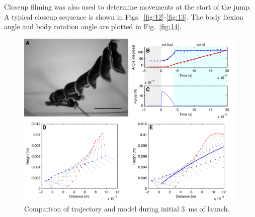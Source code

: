 \documentclass{article}
\newcommand{\Genus}[1]{\emph{#1}}
\newcommand{\Hyale}{\Genus{H.~pugettensis}}
\begin{document}
Closeup filming was also used to determine movements at the start of the jump.  A typical closeup sequence is shown in Figs.~\ref{fig:12}-\ref{fig:13}. The body flexion angle and body rotation angle are plotted in Fig.~\ref{fig:14}.  
\begin{figure}
\begin{center}
\includegraphics{figures/AmphipodLaunchFull.pdf}
\end{center}
\caption{Comparison of trajectory and model during initial \SI{3}{\milli\second} of launch.}
\end{figure}



\end{document}

